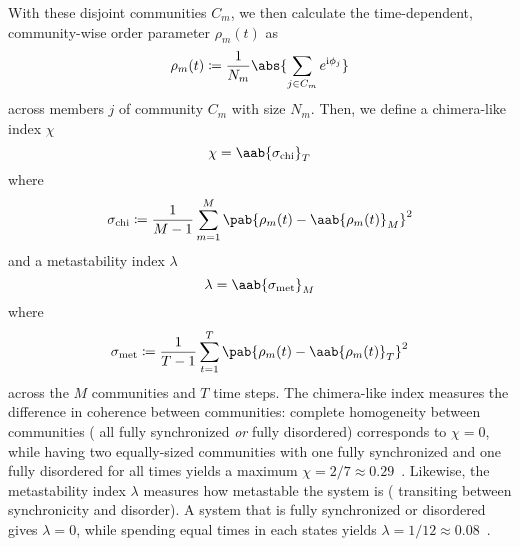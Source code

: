 \documentclass[pdflatex,lineno,referee,sn-nature]{sn-jnl}
\begin{document}
With these disjoint communities $C_m$, we then calculate
the time-dependent, community-wise order parameter $\rho_m(t)$
as
\begin{equation}
  \rho_m(t) \coloneqq \frac{1}{N_m} \abs{\sum_{j \in C_m} e^{\im \phi_j}}
\end{equation}
across members $j$ of community $C_m$ with size $N_m$.
Then, we define a chimera-like index $\chi$
\begin{equation}
  \chi = \aab{
    \sigma_{\text{chi}}}_T
  \label{eq:chimera_index}
\end{equation}
where
\begin{equation*}
    \sigma_{\text{chi}} \coloneqq \frac{1}{M-1} \sum_{m=1}^M
    \pab{\rho_m(t) - \aab{\rho_m(t)}_M}^2
\end{equation*}
and a metastability index $\lambda$
\begin{equation}
  \lambda = \aab{
    \sigma_{\text{met}}}_M
  \label{eq:metastability_index}
\end{equation}
where
\begin{equation*}
    \sigma_{\text{met}} \coloneqq \frac{1}{T-1} \sum_{t=1}^T
    \pab{\rho_m(t) - \aab{\rho_m(t)}_T}^2
\end{equation*}
across the $M$ communities and $T$ time steps.
The chimera-like index measures the difference in coherence between communities:
complete homogeneity between communities
(\eg{} all fully synchronized \emph{or} fully disordered)
corresponds to $\chi = 0$,
while having two equally-sized communities
with one fully synchronized and one fully disordered
for all times yields a maximum $\chi = 2/7 \approx
\num{0.29}$~\citep{shanahan2010metastable}.
Likewise, the metastability index $\lambda$ measures how metastable
the system is (\ie{} transiting between synchronicity and disorder).
A system that is fully synchronized or disordered gives $\lambda = 0$,
while spending equal times in each states yields $\lambda = 1/12
\approx \num{0.08}$~\citep{shanahan2010metastable}.


\backmatter{}



\appendix
\onecolumn

\end{document}
